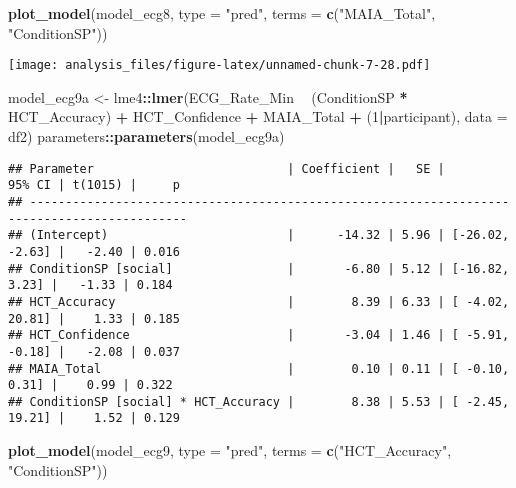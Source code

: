 \documentclass[
]{article}
\newenvironment{Shaded}{\begin{snugshade}}{\end{snugshade}}
\newcommand{\DataTypeTok}[1]{\textcolor[rgb]{0.13,0.29,0.53}{#1}}
\newcommand{\DecValTok}[1]{\textcolor[rgb]{0.00,0.00,0.81}{#1}}
\newcommand{\KeywordTok}[1]{\textcolor[rgb]{0.13,0.29,0.53}{\textbf{#1}}}
\newcommand{\NormalTok}[1]{#1}
\newcommand{\OperatorTok}[1]{\textcolor[rgb]{0.81,0.36,0.00}{\textbf{#1}}}
\newcommand{\StringTok}[1]{\textcolor[rgb]{0.31,0.60,0.02}{#1}}
\begin{document}
\begin{Shaded}
\begin{Highlighting}[]
\KeywordTok{plot_model}\NormalTok{(model_ecg8, }\DataTypeTok{type =} \StringTok{"pred"}\NormalTok{, }\DataTypeTok{terms =} \KeywordTok{c}\NormalTok{(}\StringTok{"MAIA_Total"}\NormalTok{, }\StringTok{"ConditionSP"}\NormalTok{))}
\end{Highlighting}
\end{Shaded}

\texttt{[image: analysis\_files/figure-latex/unnamed-chunk-7-28.pdf]}

\begin{Shaded}
\begin{Highlighting}[]
\NormalTok{model_ecg9a <-}\StringTok{ }\NormalTok{lme4}\OperatorTok{::}\KeywordTok{lmer}\NormalTok{(ECG_Rate_Min }\OperatorTok{~}\StringTok{ }\NormalTok{(ConditionSP }\OperatorTok{*}\StringTok{ }\NormalTok{HCT_Accuracy) }\OperatorTok{+}\StringTok{ }\NormalTok{HCT_Confidence }\OperatorTok{+}\StringTok{ }\NormalTok{MAIA_Total }\OperatorTok{+}\StringTok{ }\NormalTok{(}\DecValTok{1}\OperatorTok{|}\NormalTok{participant), }\DataTypeTok{data =}\NormalTok{ df2)}
\NormalTok{parameters}\OperatorTok{::}\KeywordTok{parameters}\NormalTok{(model_ecg9a)}
\end{Highlighting}
\end{Shaded}

\begin{verbatim}
## Parameter                           | Coefficient |   SE |          95% CI | t(1015) |     p
## --------------------------------------------------------------------------------------------
## (Intercept)                         |      -14.32 | 5.96 | [-26.02, -2.63] |   -2.40 | 0.016
## ConditionSP [social]                |       -6.80 | 5.12 | [-16.82,  3.23] |   -1.33 | 0.184
## HCT_Accuracy                        |        8.39 | 6.33 | [ -4.02, 20.81] |    1.33 | 0.185
## HCT_Confidence                      |       -3.04 | 1.46 | [ -5.91, -0.18] |   -2.08 | 0.037
## MAIA_Total                          |        0.10 | 0.11 | [ -0.10,  0.31] |    0.99 | 0.322
## ConditionSP [social] * HCT_Accuracy |        8.38 | 5.53 | [ -2.45, 19.21] |    1.52 | 0.129
\end{verbatim}

\begin{Shaded}
\begin{Highlighting}[]
\KeywordTok{plot_model}\NormalTok{(model_ecg9, }\DataTypeTok{type =} \StringTok{"pred"}\NormalTok{, }\DataTypeTok{terms =} \KeywordTok{c}\NormalTok{(}\StringTok{"HCT_Accuracy"}\NormalTok{, }\StringTok{"ConditionSP"}\NormalTok{))}
\end{Highlighting}
\end{Shaded}
\end{document}
